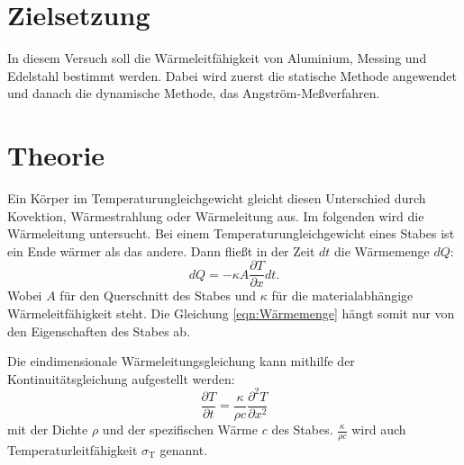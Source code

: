 \section{Zielsetzung}
\label{Zielsetzung}
In diesem Versuch soll die Wärmeleitfähigkeit von Aluminium, Messing und Edelstahl bestimmt werden.
Dabei wird zuerst die statische Methode angewendet und danach die dynamische Methode, das Angström-Meßverfahren.

\section{Theorie}
\label{Theorie}
Ein Körper im Temperaturungleichgewicht gleicht diesen Unterschied durch Kovektion, Wärmestrahlung oder Wärmeleitung aus.
Im folgenden wird die Wärmeleitung untersucht.
Bei einem Temperaturungleichgewicht eines Stabes ist ein Ende wärmer als das andere.
Dann fließt in der Zeit $dt$ die Wärmemenge $dQ$:
\begin{equation}\label{eqn:Wärmemenge}
    dQ = -\kappa A \frac{\partial T}{\partial x}dt .
\end{equation}
Wobei $A$ für den Querschnitt des Stabes und $\kappa$ für die materialabhängige Wärmeleitfähigkeit steht.
Die Gleichung \ref{eqn:Wärmemenge} hängt somit nur von den Eigenschaften des Stabes ab.

Die eindimensionale Wärmeleitungsgleichung kann mithilfe der Kontinuitätsgleichung aufgestellt werden:
\begin{equation}
    \frac{\partial T}{\partial t} = \frac{\kappa}{\rho c} \frac{\partial^2 T}{\partial x^2}
\end{equation}
mit der Dichte $\rho$ und der spezifischen Wärme $c$ des Stabes.
$\frac{\kappa}{\rho c}$ wird auch Temperaturleitfähigkeit $\sigma_\text{T}$ genannt.

